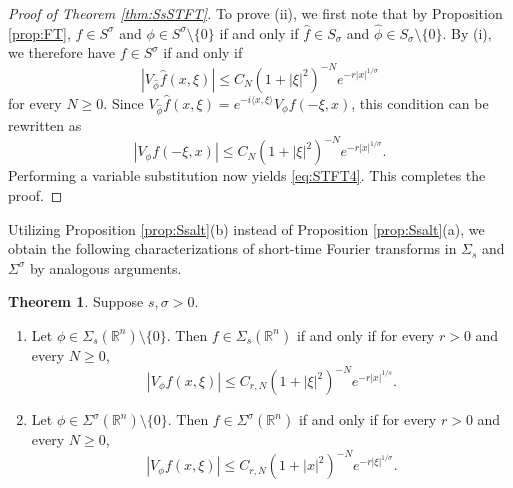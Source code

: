 \documentclass[11pt,a4paper,reqno]{amsart}
\numberwithin{equation}{section}
\theoremstyle{definition}
\newtheorem{thm}{Theorem}[section]
\theoremstyle{definition}
\begin{document}
\begin{proof}[Proof of Theorem \ref{thm:SsSTFT}]
To prove (ii), we first note that by Proposition \ref{prop:FT}, $f\in S^\sigma$ and $\phi\in S^\sigma\setminus\{0\}$ if and only if $\hat{f}\in S_\sigma$ and $\hat{\phi}\in S_\sigma\setminus\{0\}$. By (i), we therefore have $f\in S^\sigma$ if and only if
\begin{equation*}
    |V_{\hat{\phi}} \hat{f}(x,\xi)| \leq C_N (1+|\xi|^2)^{-N} e^{-r |x|^{1/\sigma}}
\end{equation*}
for every $N\geq 0$. Since $V_{\hat{\phi}} \hat{f}(x,\xi) = e^{-i\langle x,\xi \rangle} V_{\phi}f (-\xi,x)$, this condition can be rewritten as
\begin{equation*}
    |V_{\phi} f(-\xi,x)| \leq C_N (1+|\xi|^2)^{-N} e^{-r |x|^{1/\sigma}}.
\end{equation*}
Performing a variable substitution now yields \eqref{eq:STFT4}. This completes the proof.
\end{proof}

Utilizing Proposition \ref{prop:Ssalt}(b) instead of Proposition \ref{prop:Ssalt}(a), we obtain the following characterizations of short-time Fourier transforms in $\Sigma_s$ and $\Sigma^\sigma$ by analogous arguments.
\begin{thm}
Suppose $s,\sigma> 0$.
\begin{enumerate}[label=(\roman*)]
    \item Let $\phi\in \Sigma_s(\mathbb{R}^n)\setminus\{0\}$. Then $f\in \Sigma_s(\mathbb{R}^n)$ if and only if for every $r>0$ and every $N\geq 0$, 
        \begin{equation*}
            |V_\phi f(x,\xi) | \leq C_{r,N} (1+|\xi|^2)^{-N} e^{- r |x|^{1/s}}.
        \end{equation*}
    \item Let $\phi\in \Sigma^\sigma(\mathbb{R}^n)\setminus\{0\}$. Then $f\in \Sigma^\sigma(\mathbb{R}^n)$ if and only if for every $r>0$ and every $N\geq 0$,
\begin{equation*}
    |V_\phi f(x,\xi) | \leq C_{r,N} (1+|x|^2)^{-N} e^{- r |\xi|^{1/\sigma}}.
\end{equation*}
\end{enumerate}
\end{thm}
\end{document}
